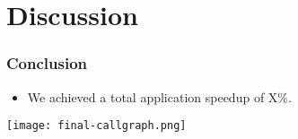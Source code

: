 \section{Discussion}

\begin{frame}
  \frametitle{Conclusion}
    \begin{itemize}
        \item We achieved a total application speedup of X\%.
        \end{itemize}  
    \begin{center}
        \texttt{[image: final-callgraph.png]}
    \end{center}
\end{frame}

